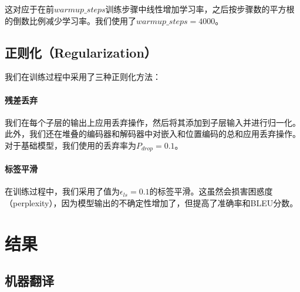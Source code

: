 \documentclass[lang=cn,a4paper,newtx]{elegantpaper}
\begin{document}
这对应于在前$warmup\_steps$训练步骤中线性增加学习率，之后按步骤数的平方根的倒数比例减少学习率。我们使用了$warmup\_steps=4000$。

\subsection{正则化（Regularization）} \label{sec:reg}

我们在训练过程中采用了三种正则化方法：
\paragraph{残差丢弃} 我们在每个子层的输出上应用丢弃操作，然后将其添加到子层输入并进行归一化。此外，我们还在堆叠的编码器和解码器中对嵌入和位置编码的总和应用丢弃操作。对于基础模型，我们使用的丢弃率为$P_{drop}=0.1$。

\paragraph{标签平滑} 在训练过程中，我们采用了值为$\epsilon_{ls}=0.1$的标签平滑。这虽然会损害困惑度（perplexity），因为模型输出的不确定性增加了，但提高了准确率和BLEU分数。

\section{结果} \label{sec:results}

\subsection{机器翻译}
\end{document}
